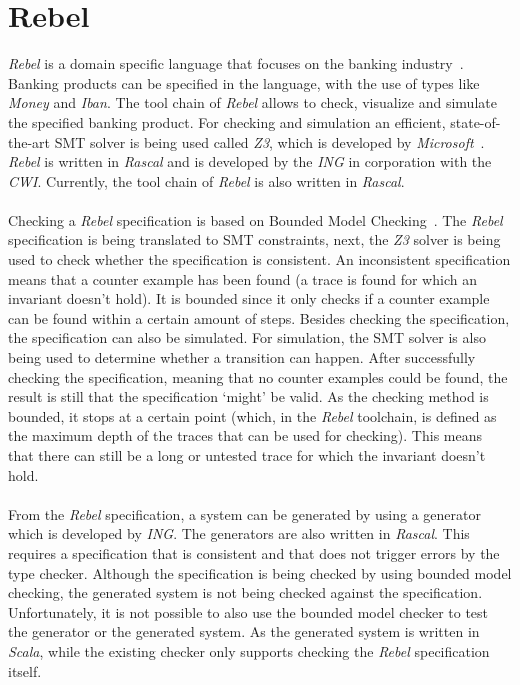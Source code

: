 \section{Rebel}
\textit{Rebel} is a domain specific language that focuses on the banking
industry~\cite{stoel2016solving}. Banking products can be specified in the
language, with the use of types like \textit{Money} and \textit{Iban}. The tool
chain of \textit{Rebel} allows to check, visualize and simulate the specified
banking product. For checking and simulation an efficient, state-of-the-art SMT
solver is being used called \textit{Z3}, which is developed by
\textit{Microsoft}~\cite{de2008z3}. \textit{Rebel} is written in \textit{Rascal}
and is developed by the \textit{ING} in corporation with the \textit{CWI}.
Currently, the tool chain of \textit{Rebel} is also written in
\textit{Rascal}.\\
\\
Checking a \textit{Rebel} specification is based on Bounded Model
Checking~\cite{stoel2016solving}. The \textit{Rebel} specification is being
translated to SMT constraints, next, the \textit{Z3} solver is being used to
check whether the specification is consistent. An inconsistent specification
means that a counter example has been found (a trace is found for which an
invariant doesn't hold). It is bounded since it only checks if a counter example
can be found within a certain amount of steps. Besides checking the
specification, the specification can also be simulated. For simulation, the SMT
solver is also being used to determine whether a transition can happen. After
successfully checking the specification, meaning that no counter examples could
be found, the result is still that the specification `might' be valid. As the
checking method is bounded, it stops at a certain point (which, in the
\textit{Rebel} toolchain, is defined as the maximum depth of the traces that can
be used for checking). This means that there can still be a long or untested
trace for which the invariant doesn't hold.\\
\\
From the \textit{Rebel} specification, a system can be generated by using a
generator which is developed by \textit{ING}. The generators are also written in
\textit{Rascal}. This requires a specification that is consistent and that does
not trigger errors by the type checker. Although the specification is being
checked by using bounded model checking, the generated system is not being
checked against the specification. Unfortunately, it is not possible to also use
the bounded model checker to test the generator or the generated system. As the
generated system is written in \textit{Scala}, while the existing checker only
supports checking the \textit{Rebel} specification itself.

